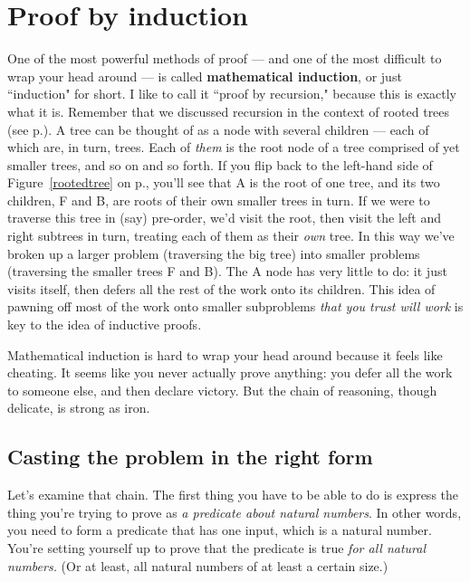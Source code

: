 
\section{Proof by induction}

One of the most powerful methods of proof --- and one of the most difficult
to wrap your head around --- is called \textbf{mathematical induction}, or
just ``induction" for short. I like to call it ``proof by recursion,"
because this is exactly what it is. Remember that we discussed recursion in
the context of rooted trees (see p.\pageref{recursion}). A tree can be thought
of as a node with several children --- each of which are, in turn, trees.
Each of \textit{them} is the root node of a tree comprised of yet
smaller trees, and so on and so forth. If you flip back to the left-hand
side of Figure~\ref{rootedtree} on p.\pageref{page:rootedtree}, you'll see that
A is the root of one tree, and its two children, F and B, are roots of
their own smaller trees in turn. If we were to traverse this tree in (say)
pre-order, we'd visit the root, then visit the left and right subtrees in
turn, treating each of them as their \textit{own} tree. In this way we've
broken up a larger problem (traversing the big tree) into smaller problems
(traversing the smaller trees F and B). The A node has very little to do:
it just visits itself, then defers all the rest of the work onto its
children. This idea of pawning off most of the work onto smaller
subproblems \textit{that you trust will work} is key to the idea of
inductive proofs.

Mathematical induction is hard to wrap your head around because it feels
like cheating. It seems like you never actually prove anything: you defer
all the work to someone else, and then declare victory. But the chain of
reasoning, though delicate, is strong as iron.

\subsection{Casting the problem in the right form}

Let's examine that chain. The first thing you have to be able to do is
express the thing you're trying to prove as \textit{a predicate about
natural numbers}. In other words, you need to form a predicate that has one
input, which is a natural number. You're setting yourself up to prove that
the predicate is true \textit{for all natural numbers.} (Or at least, all
natural numbers of at least a certain size.)

